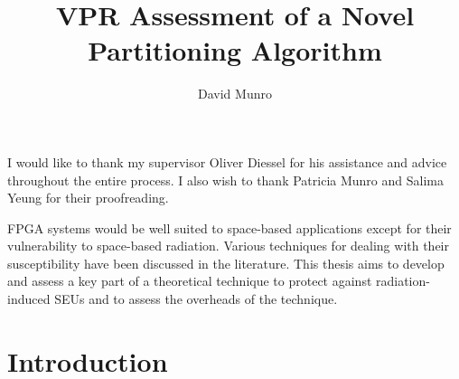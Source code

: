 \documentclass[12pt,final,oneside]{dwThesis} %
\title{VPR Assessment of a Novel Partitioning Algorithm}
\author{David Munro}
\begin{document}
   \maketitle
   \begin{acknowledgements}
      I would like to thank my supervisor Oliver Diessel for his assistance and advice throughout the entire process. I also wish to thank Patricia Munro and Salima Yeung for their proofreading.

   \end{acknowledgements}
   \begin{abstracts}
      \gls{FPGA} systems would be well suited to space-based applications except for their vulnerability to space-based radiation. Various techniques for dealing with their susceptibility have been discussed in the literature. This thesis aims to develop and assess a key part of a theoretical technique to protect against radiation-induced \glspl{SEU} and to assess the overheads of the technique.
      \glsresetall
   \end{abstracts}
   \newpage
   \tableofcontents*
   \listoffixmes
   \newpage
   \printglossaries
   \chapter{Introduction}
\end{document}
